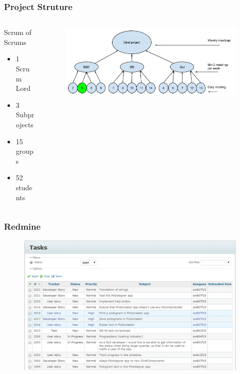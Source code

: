 \begin{frame}
	\begin{center}
		\frametitle{Project Struture}
		\begin{columns} %
			\begin{column}{.3\textwidth}
				Scrum of Scrums
				\begin{itemize}
					\item 1 Scrum Lord
					\item 3 Subprojects
					\item 15 groups
					\item 52 students
				\end{itemize}
			\end{column}%
			\begin{column}{.80\textwidth}
				\begin{figure}[H]
					\centering
					\includegraphics[width= 0.8 \textwidth]{pictures/ScrumOfScrum.png}
				\end{figure}
			\end{column}%
		\end{columns}
	\end{center}
\end{frame}

\begin{frame}
	\begin{center}
		\frametitle{Redmine}
		\begin{figure}[H]
			\centering
			\includegraphics[width= 0.8 \textwidth]{pictures/RedmineStory.png}
		\end{figure}
	\end{center}
\end{frame}

